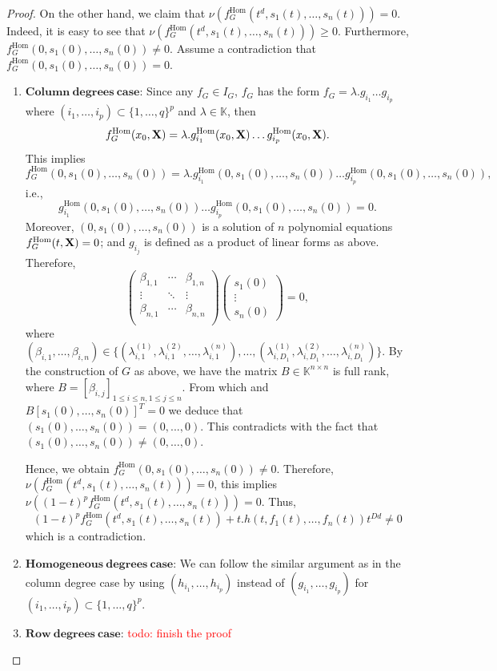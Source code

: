 \documentclass[11pt]{article}
\numberwithin{Property}{section}
\numberwithin{Theorem}{section}
\numberwithin{Proposition}{section}
\numberwithin{Lemma}{section}
\numberwithin{Corollary}{section}
\numberwithin{Definition}{section}
\numberwithin{Remark}{section}
\numberwithin{Conjecture}{section}
\numberwithin{Problem}{section}
\numberwithin{Example}{section}
\numberwithin{Claim}{section}
\renewcommand{\leq}{\leqslant}
\renewcommand{\ge}{\geqslant}
\renewcommand{\ge}{\geqslant} %
\newcommand{\field}{\mathbb{K}} %
\newcommand{\mat}[1]{\mathbf{\MakeUppercase{#1}}} %
\newcommand{\todo}[1]{\textcolor{red}{#1}} %
\begin{document}
\begin{proof}
On the other hand, we claim that $\nu(f_G^{\mathrm{Hom}}(t^d, s_1(t), \ldots, s_n(t))) = 0$. Indeed, it is easy to see that $\nu(f_G^{\mathrm{Hom}}(t^d, s_1(t), \ldots, s_n(t))) \ge 0$. Furthermore, $f_G^{\mathrm{Hom}}(0, s_1(0), \ldots, s_n(0)) \ne 0$. Assume a contradiction that $f_G^{\mathrm{Hom}}(0, s_1(0), \ldots, s_n(0)) = 0$.
\begin{enumerate}
\item  $\mathbf{Column \ degrees \ case}$:  
 Since any $f_G \in I_G$, $f_G$ has the form $f_G = \lambda. g_{i_1} \ldots g_{i_p}$ where $(i_1, \ldots, i_p)\subset \{1, \ldots, q\}^p$ and $\lambda \in \field$, then 
\[
f_G^{\mathrm{Hom}}(x_0, \mat{X}) = \lambda.g_{i_1}^{\mathrm{Hom}}(x_0,\mat{X}) \ldots g_{i_p}^{\mathrm{Hom}}(x_0, \mat{X}).
\] This implies 
\[
f_G^{\mathrm{Hom}}(0, s_1(0), \ldots, s_n(0)) = \lambda.g_{i_1}^{\mathrm{Hom}}(0, s_1(0), \ldots, s_n(0)) \ldots g_{i_p}^{\mathrm{Hom}}(0, s_1(0),\ldots, s_n(0)),
\] i.e., 
\[
g_{i_1}^{\mathrm{Hom}}(0, s_1(0), \ldots, s_n(0)) \ldots g_{i_p}^{\mathrm{Hom}}(0, s_1(0), \ldots, s_n(0)) = 0.
\]
Moreover, $(0, s_1(0), \ldots, s_n(0))$ is a solution of $n$ polynomial equations $f_G^{\mathrm{Hom}}(t, \mat{X}) = 0$; and $g_{i_j}$ is defined as a product of linear forms as above. Therefore, 
\[
\left( \begin{matrix}
\beta_{1,1} & \cdots & \beta_{1,n}\\
\vdots &  \ddots & \vdots \\
\beta_{n,1} & \cdots & \beta_{n,n}\\
\end{matrix} \right)\left(\begin{matrix}
s_1(0)\\
\vdots \\
s_n(0)
\end{matrix}\right) = 0,
\]
where $(\beta_{i,1}, \ldots, \beta_{i,n}) \in \{(\lambda_{i,1}^{(1)}, \lambda_{i,1}^{(2)}, \ldots, \lambda_{i,1}^{(n)}), \ldots, (\lambda_{i,D_1}^{(1)}, \lambda_{i,D_1}^{(2)}, \ldots, \lambda_{i,D_1}^{(n)})\}$. By the construction of $G$ as above, we have the matrix $B \in \field^{n \times n}$ is full rank, where $B = [\beta_{i,j}]_{1 \leq i \leq n, 1 \leq j \leq n}$. From which and $B[s_1(0), \ldots, s_n(0)]^T = 0$ we deduce that $(s_1(0), \ldots, s_n(0)) = (0, ..., 0)$. This contradicts with the fact that $(s_1(0), \ldots, s_n(0)) \ne (0, \ldots, 0)$. 

Hence, we obtain $f_G^{\mathrm{Hom}}(0, s_1(0),\ldots, s_n(0)) \ne 0$. Therefore, $\nu(f_G^{\mathrm{Hom}}(t^d, s_1(t), \ldots, s_n(t))) = 0$, this implies $\nu((1-t)^pf_G^{\mathrm{Hom}}(t^d, s_1(t), \ldots, s_n(t))) = 0$. Thus, \[(1-t)^pf_G^{\mathrm{Hom}}(t^d, s_1(t), \ldots, s_n(t))  + t.h(t, f_1(t), \ldots, f_n(t))t^{Dd} \neq 0\] which is a contradiction. 
\item $\mathbf{Homogeneous \ degrees \ case}$: We can follow the similar argument as in the column degree case by using $(h_{i_1}, \ldots, h_{i_p})$ instead of $(g_{i_1}, \ldots, g_{i_p})$ for $(i_1, \ldots, i_p) \subset \{1, \ldots, q\}^p$.
\item  $\mathbf{Row \ degrees \ case}$: \todo{todo: finish the proof}
\end{enumerate}
\end{proof}
\end{document}
